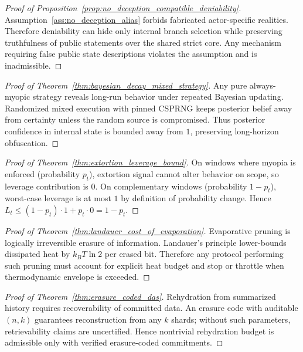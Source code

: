 \documentclass[11pt]{article}
\theoremstyle{definition}
\theoremstyle{plain}
\begin{document}
\begin{proof}[Proof of Proposition~\ref{prop:no_deception_compatible_deniability}]
Assumption~\ref{ass:no_deception_alias} forbids fabricated actor-specific realities.
Therefore deniability can hide only internal branch selection while preserving truthfulness of public statements over the shared strict core.
Any mechanism requiring false public state descriptions violates the assumption and is inadmissible.
\end{proof}

\begin{proof}[Proof of Theorem~\ref{thm:bayesian_decay_mixed_strategy}]
Any pure always-myopic strategy reveals long-run behavior under repeated Bayesian updating.
Randomized mixed execution with pinned CSPRNG keeps posterior belief away from certainty unless the random source is compromised.
Thus posterior confidence in internal state is bounded away from $1$, preserving long-horizon obfuscation.
\end{proof}

\begin{proof}[Proof of Theorem~\ref{thm:extortion_leverage_bound}]
On windows where myopia is enforced (probability $p_t$), extortion signal cannot alter behavior on scope, so leverage contribution is $0$.
On complementary windows (probability $1-p_t$), worst-case leverage is at most $1$ by definition of probability change.
Hence $L_t\le (1-p_t)\cdot 1 + p_t\cdot 0 = 1-p_t$.
\end{proof}

\begin{proof}[Proof of Theorem~\ref{thm:landauer_cost_of_evaporation}]
Evaporative pruning is logically irreversible erasure of information.
Landauer's principle lower-bounds dissipated heat by $k_B T\ln 2$ per erased bit.
Therefore any protocol performing such pruning must account for explicit heat budget and stop or throttle when thermodynamic envelope is exceeded.
\end{proof}

\begin{proof}[Proof of Theorem~\ref{thm:erasure_coded_das}]
Rehydration from summarized history requires recoverability of committed data.
An erasure code with auditable $(n,k)$ guarantees reconstruction from any $k$ shards; without such parameters, retrievability claims are uncertified.
Hence nontrivial rehydration budget is admissible only with verified erasure-coded commitments.
\end{proof}
\end{document}
